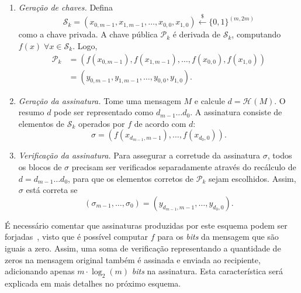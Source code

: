 \documentclass{ufsctex/ufsctex}
\newcommand{\pk}{\mathcal{P}_{k}}
\newcommand{\sk}{\mathcal{S}_{k}}
\newcommand{\hash}[2][]{\mathcal{H}^{#1} (#2)}
\newcommand{\binwds}[1]{\{0, 1\}^{#1}}
\newcommand{\random}{\stackrel{\$}{\longleftarrow}}
\begin{document}
\begin{enumerate}

  \item[] \emph{Geração de chaves.} Defina
      \begin{equation}
        \sk{} = (x_{0, m - 1}, x_{1, m - 1}, \dots, x_{0, 0}, x_{1, 0})
          \random{} \binwds{(m, 2m)}
      \end{equation}
        como a chave privada.\simbolo{$\random{}$}{Seleção aleatória} A chave
        pública $\pk{}$ é derivada de $\sk{}$,
        computando $f(x) \; \forall x \in \sk{}$. Logo,
        \begin{align}
          \pk{} &= (f(x_{0, m - 1}), f(x_{1, m - 1}),
            \dots, f(x_{0, 0}), f(x_{1, 0})) \\
                &= (y_{0, m - 1}, y_{1, m - 1},
            \dots, y_{0, 0}, y_{1, 0}).
        \end{align}

  \item[] \emph{Geração da assinatura.} Tome uma mensagem $M$ e calcule $d =
      \hash{M}$. O resumo $d$ pode ser representado como $d_{m - 1} \dots
        d_{0}$. A assinatura consiste de elementos de $\sk{}$ operados por $f$
        de acordo com $d$:
        \begin{equation}
          \sigma = (f(x_{d_{m - 1}, m - 1}), \dots, f(x_{d_{0}, 0})).
        \end{equation}

  \item[] \emph{Verificação da assinatura.} Para assegurar a corretude da
      assinatura $\sigma$, todos os blocos de $\sigma$ precisam ser verificados
        separadamente através do recálculo de $d = d_{m - 1} \dots d_{0}$, para
        que os elementos corretos de $\pk{}$ sejam escolhidos. Assim, $\sigma$
        está correta se
        \begin{equation}
          (\sigma_{m - 1}, \dots, \sigma_{0})
            = (y_{d_{m - 1}, m - 1}, \dots, y_{d_{0}, 0}).
        \end{equation}

\end{enumerate}

É necessário comentar que assinaturas produzidas por este esquema podem ser
forjadas~\cite[Capítulo 3]{Merkle:inproc:1989:aug}, visto que é possível
computar $f$ para os \emph{bits} da mensagem que são iguais a zero. Assim, uma
soma de verificação representando a quantidade de zeros na mensagem original
também é assinada e enviada ao recipiente, adicionando apenas $m \cdot
\log_2(m)$ \emph{bits} na assinatura. Esta característica será explicada em
mais detalhes no próximo esquema.
\end{document}
